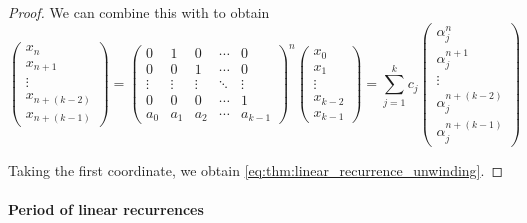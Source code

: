 \begin{proof}
  We can combine this with  to obtain
  \begin{equation*}
    \begin{pmatrix}
      x_n         \\
      x_{n+1}     \\
      \vdots      \\
      x_{n+(k-2)} \\
      x_{n+(k-1)}
    \end{pmatrix}
    =
    \begin{pmatrix}
      0      & 1      & 0      & \cdots & 0      \\
      0      & 0      & 1      & \cdots & 0      \\
      \vdots & \vdots & \vdots & \ddots & \vdots \\
      0      & 0      & 0      & \cdots & 1      \\
      a_0    & a_1    & a_2    & \cdots & a_{k-1}
    \end{pmatrix}^n
    \begin{pmatrix}
      x_0     \\
      x_1     \\
      \vdots  \\
      x_{k-2} \\
      x_{k-1}
    \end{pmatrix}
    =
    \sum_{j=1}^k c_j
    \begin{pmatrix}
      \alpha_j^n         \\
      \alpha_j^{n+1}     \\
      \vdots             \\
      \alpha_j^{n+(k-2)} \\
      \alpha_j^{n+(k-1)}
    \end{pmatrix}
  \end{equation*}

  Taking the first coordinate, we obtain \eqref{eq:thm:linear_recurrence_unwinding}.
\end{proof}

\paragraph{Period of linear recurrences}

